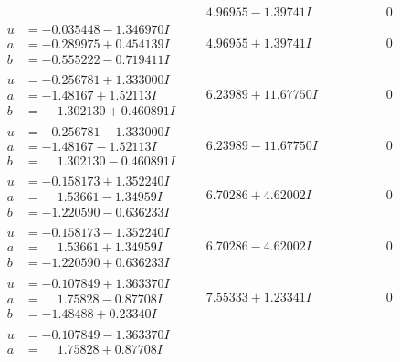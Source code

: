 \documentclass[1p]{elsarticle_modified}
\theoremstyle{definition}
\begin{document}
$$\begin{array}{c|c|c}
 & \phantom{-}4.96955 - 1.39741 I & \phantom{-0.000000 } 0 \\ \hline\begin{aligned}
u &= -0.035448 - 1.346970 I \\
a &= -0.289975 + 0.454139 I \\
b &= -0.555222 - 0.719411 I\end{aligned}
 & \phantom{-}4.96955 + 1.39741 I & \phantom{-0.000000 } 0 \\ \hline\begin{aligned}
u &= -0.256781 + 1.333000 I \\
a &= -1.48167 + 1.52113 I \\
b &= \phantom{-}1.302130 + 0.460891 I\end{aligned}
 & \phantom{-}6.23989 + 11.67750 I & \phantom{-0.000000 } 0 \\ \hline\begin{aligned}
u &= -0.256781 - 1.333000 I \\
a &= -1.48167 - 1.52113 I \\
b &= \phantom{-}1.302130 - 0.460891 I\end{aligned}
 & \phantom{-}6.23989 - 11.67750 I & \phantom{-0.000000 } 0 \\ \hline\begin{aligned}
u &= -0.158173 + 1.352240 I \\
a &= \phantom{-}1.53661 - 1.34959 I \\
b &= -1.220590 - 0.636233 I\end{aligned}
 & \phantom{-}6.70286 + 4.62002 I & \phantom{-0.000000 } 0 \\ \hline\begin{aligned}
u &= -0.158173 - 1.352240 I \\
a &= \phantom{-}1.53661 + 1.34959 I \\
b &= -1.220590 + 0.636233 I\end{aligned}
 & \phantom{-}6.70286 - 4.62002 I & \phantom{-0.000000 } 0 \\ \hline\begin{aligned}
u &= -0.107849 + 1.363370 I \\
a &= \phantom{-}1.75828 - 0.87708 I \\
b &= -1.48488 + 0.23340 I\end{aligned}
 & \phantom{-}7.55333 + 1.23341 I & \phantom{-0.000000 } 0 \\ \hline\begin{aligned}
u &= -0.107849 - 1.363370 I \\
a &= \phantom{-}1.75828 + 0.87708 I \\

\end{aligned}
\end{array}$$
\end{document}
